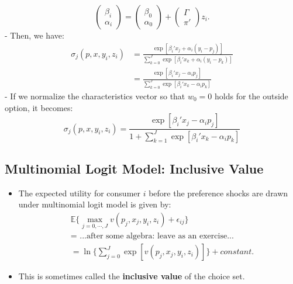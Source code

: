\documentclass[
]{book}
\providecommand{\tightlist}{%
  \setlength{\itemsep}{0pt}\setlength{\parskip}{0pt}}
\begin{document}
\begin{equation}
\begin{pmatrix}
\beta_i \\
\alpha_i
\end{pmatrix}
= 
\begin{pmatrix}
\beta_0 \\
\alpha_0
\end{pmatrix}
+
\begin{pmatrix}
\Gamma\\
\pi'
\end{pmatrix}
 z_i.
\end{equation}
- Then, we have:
\begin{equation}
\begin{split}
\sigma_{j}(p, x, y_i, z_i) &= \frac{\exp[\beta_i'x_j + \alpha_i (y_i - p_j) ]}{\sum_{k = 0}^J \exp[\beta_i'x_k + \alpha_i (y_i - p_k) ]}\\
&= \frac{\exp[\beta_i'x_j - \alpha_i p_j]}{\sum_{k = 0}^J \exp[\beta_i'x_k - \alpha_i p_k]}
\end{split}
\end{equation}
- If we normalize the characteristics vector so that \(w_0 = 0\) holds for the outside option, it becomes:
\[
\sigma_{j}(p, x, y_i, z_i) = \frac{\exp[\beta_i'x_j - \alpha_i p_j]}{1 + \sum_{k = 1}^J \exp[\beta_i'x_k - \alpha_i p_k]}
\]

\hypertarget{multinomial-logit-model-inclusive-value}{%
\subsection{Multinomial Logit Model: Inclusive Value}\label{multinomial-logit-model-inclusive-value}}

\begin{itemize}
\tightlist
\item
  The expected utility for consumer \(i\) before the preference shocks are drawn under multinomial logit model is given by:
  \begin{equation}
  \begin{split}
  &\mathbb{E}\{\max_{j = 0, \cdots, J} v(p_j, x_j, y_i, z_i) + \epsilon_{ij}\} \\
  &= \text{   ...after some algebra: leave as an exercise...}\\
  &= \ln \Bigg\{\sum_{j = 0}^J \exp[v(p_j, x_j, y_i, z_i)] \Bigg\} + constant.
  \end{split} 
  \end{equation}
\item
  This is sometimes called the \textbf{inclusive value} of the choice set.
\end{itemize}
\end{document}

